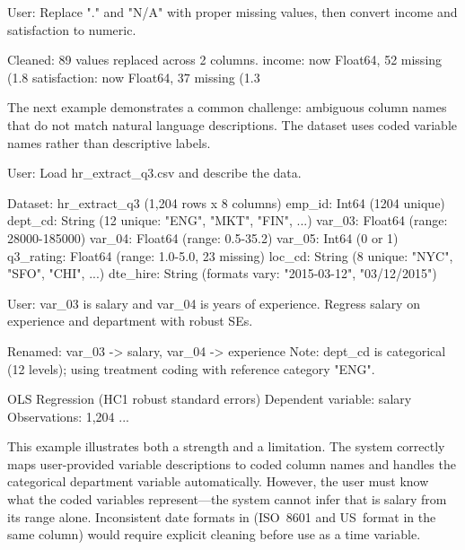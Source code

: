 \begin{Sinput}
User: Replace "." and "N/A" with proper missing values, then convert
      income and satisfaction to numeric.
\end{Sinput}

\begin{Soutput}
Cleaned: 89 values replaced across 2 columns.
  income:        now Float64, 52 missing (1.8%
  satisfaction:  now Float64, 37 missing (1.3%
\end{Soutput}

\noindent The next example demonstrates a common challenge: ambiguous
column names that do not match natural language descriptions. The
dataset uses coded variable names rather than descriptive labels.

\begin{Sinput}
User: Load hr_extract_q3.csv and describe the data.
\end{Sinput}

\begin{Soutput}
Dataset: hr_extract_q3 (1,204 rows x 8 columns)
  emp_id:    Int64 (1204 unique)
  dept_cd:   String (12 unique: "ENG", "MKT", "FIN", ...)
  var_03:    Float64 (range: 28000-185000)
  var_04:    Float64 (range: 0.5-35.2)
  var_05:    Int64 (0 or 1)
  q3_rating: Float64 (range: 1.0-5.0, 23 missing)
  loc_cd:    String (8 unique: "NYC", "SFO", "CHI", ...)
  dte_hire:  String (formats vary: "2015-03-12", "03/12/2015")
\end{Soutput}

\begin{Sinput}
User: var_03 is salary and var_04 is years of experience.
      Regress salary on experience and department with robust SEs.
\end{Sinput}

\begin{Soutput}
Renamed: var_03 -> salary, var_04 -> experience
Note: dept_cd is categorical (12 levels); using treatment coding
with reference category "ENG".

OLS Regression (HC1 robust standard errors)
  Dependent variable: salary
  Observations: 1,204
  ...
\end{Soutput}

\noindent This example illustrates both a strength and a limitation.
The system correctly maps user-provided variable descriptions to coded
column names and handles the categorical department variable
automatically. However, the user must know what the coded variables
represent---the system cannot infer that  is salary
from its range alone.  Inconsistent date formats in 
(ISO~8601 and US~format in the same column) would require explicit
cleaning before use as a time variable.
